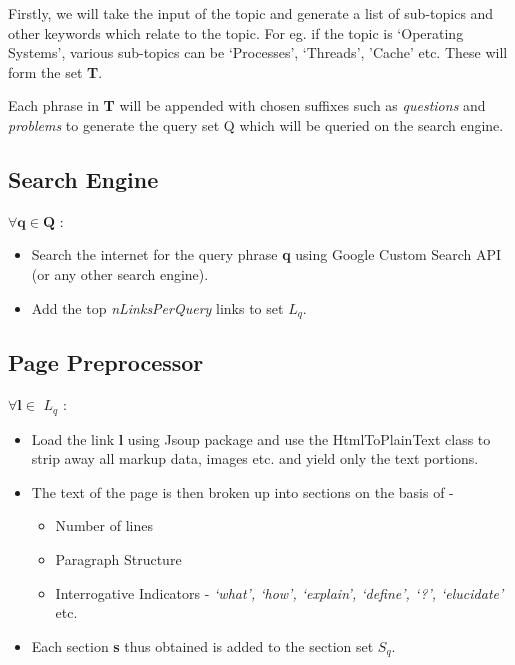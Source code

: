 \documentclass[10pt,a4paper]{report}
\begin{document}
Firstly, we will take the input of the topic and generate a list of sub-topics and other keywords which relate to the topic. For eg. if the topic is `Operating Systems', various sub-topics can be `Processes', `Threads', 'Cache' etc. These will form the set \textbf{T}.

Each phrase in \textbf{T} will be appended with chosen suffixes such as \textit{questions} and \textit{problems} to generate the query set Q which will be queried on the search engine.

\subsection{Search Engine}

$\forall \textbf{q} \in \textbf{Q}$ :

\begin{itemize}

	\item Search the internet for the query phrase \textbf{q} using Google Custom Search API (or any other search engine).
	\item Add the top \textit{nLinksPerQuery} links to set \textbf{$L_{q}$}.

\end{itemize}

\subsection{Page Preprocessor}

$\forall \textbf{l} \in$ \textbf{$L_{q}$} :

\begin{itemize}
	\item Load the link \textbf{l} using Jsoup package and use the HtmlToPlainText class to strip away all markup data, images etc. and yield only the text portions.
	\item The text of the page is then broken up into sections on the basis of - \\
	\begin{itemize}
		\item Number of lines
		\item Paragraph Structure
		\item Interrogative Indicators - \textit{`what', `how', `explain', `define', `?', `elucidate'} etc.
	\end{itemize}
	\item Each section \textbf{s} thus obtained is added to the section set \textbf{$S_{q}$}.
\end{itemize} 
\end{document}
